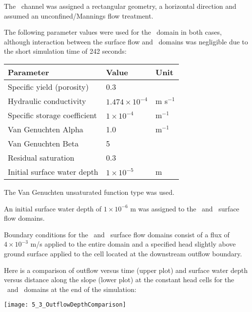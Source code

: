 The \cln\ channel was assigned a rectangular geometry, a horizontal direction and assumed an unconfined/Mannings flow treatment.

The following parameter values were used for the \gwf\ domain in both cases, although interaction between the surface flow and \gwf\ domains was negligible due to the short simulation time of 242 seconds:

\begin{center}
    \begin{tabular}{lll}  \hline
        Parameter                     & Value & Unit                                \\ \hline
        Specific yield (porosity)     &  0.3                        &               \\
        Hydraulic conductivity        &  $ 1.474 \times 10^{-4}$    &   m s$^{-1}$  \\
        Specific storage coefficient  &  $ 1 \times 10^{-4}$        &   m$^{-1}$    \\
        Van Genuchten Alpha           &  1.0                        &   m$^{-1}$    \\
        Van Genuchten Beta            &  5                          &               \\
        Residual saturation           &  0.3                        &               \\
        Initial surface water depth   &  $1 \times 10^{-5}$         &   m           \\
    \hline
    \end{tabular}
\end{center}

The Van Genuchten unsaturated function type was used.

An initial surface water depth of $1 \times 10^{-6}$ m was assigned to the \swf\ and \cln\ surface flow domains.

Boundary conditions for the \swf\ and \cln\ surface flow domains consist of a flux of $4 \times 10^{-3}$ m/s applied to the entire domain and a specified head slightly above ground surface applied to the cell located at the downstream outflow boundary.

\pagebreak
Here is a comparison of outflow versus time (upper plot)  and surface water depth versus distance along the slope (lower plot) at the constant head cells for the \swf\ and \cln\ domains at the end of the simulation:

\texttt{[image: 5\_3\_OutflowDepthComparison]}

